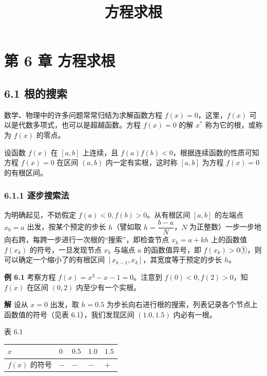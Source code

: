 \documentclass[
  10pt,
  fontset=fandol]{ctexart}
\title{方程求根}
\author{}
\date{}
\newcounter{none} %
\begin{document}
\maketitle

\section{第 6 章 方程求根}\label{ux7b2c-6-ux7ae0-ux65b9ux7a0bux6c42ux6839}

\subsection{6.1 根的搜索}\label{ux6839ux7684ux641cux7d22}

数学、物理中的许多问题常常归结为求解函数方程 \(f(x)=0\)，这里，\(f(x)\) 可以是代数多项式，也可以是超越函数。方程 \(f(x)=0\) 的解 \(x^*\) 称为它的根，或称为 \(f(x)\) 的零点。

设函数 \(f(x)\) 在 \([a,b]\) 上连续，且 \(f(a)f(b)<0\)，根据连续函数的性质可知方程 \(f(x)=0\) 在区间 \((a,b)\) 内一定有实根，这时称 \([a,b]\) 为方程 \(f(x)=0\) 的有根区间。

\subsubsection{6.1.1 逐步搜索法}\label{ux9010ux6b65ux641cux7d22ux6cd5}

为明确起见，不妨假定 \(f(a)<0,f(b)>0\)。从有根区间 \([a,b]\) 的左端点 \(x_0=a\) 出发，按某个预定的步长 \(h\)（譬如取 \(h=\dfrac{b-a}{N}\)，\(N\) 为正整数）一步一步地向右跨，每跨一步进行一次根的``搜索''，即检查节点 \(x_k=a+kh\) 上的函数值 \(f(x_k)\) 的符号，一旦发现节点 \(x_k\) 与端点 \(a\) 的函数值异号，即 \(f(x_k)>0\)①，则可以确定一个缩小了的有根区间 \([x_{k-1},x_k]\)，其宽度等于预定的步长 \(h\)。

\textbf{例 6.1} 考察方程 \(f(x)=x^3-x-1=0\)。注意到 \(f(0)<0,f(2)>0\)，知 \(f(x)\) 在区间 \((0,2)\) 内至少有一个实根。

\textbf{解} 设从 \(x=0\) 出发，取 \(h=0.5\) 为步长向右进行根的搜索，列表记录各个节点上函数值的符号（见表 6.1），我们发现区间 \((1.0,1.5)\) 内必有一根。

表 6.1

{\def\LTcaptype{none} %
\begin{longtable}[]{@{}lllll@{}}
\toprule\noalign{}
\(x\) & \(0\) & \(0.5\) & \(1.0\) & \(1.5\) \\
\midrule\noalign{}
\endhead
\bottomrule\noalign{}
\endlastfoot
\(f(x)\) 的符号 & \(-\) & \(-\) & \(-\) & \(+\) \\
\end{longtable}
}
\end{document}
